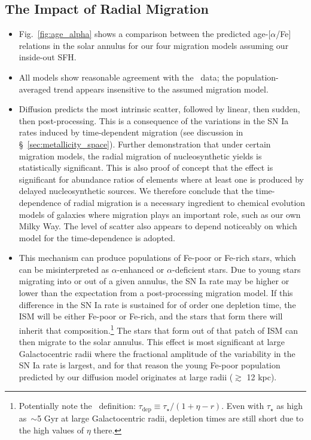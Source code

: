 \documentclass[fleqn, usenatbib]{mnras}
\begin{document}
\subsection{The Impact of Radial Migration} 
\label{sec:age_alpha:migration} 
\begin{itemize} 
	\item Fig.~\ref{fig:age_alpha} shows a comparison 
	between the predicted age-[$\alpha$/Fe] relations in the solar annulus for 
	our four migration models assuming our inside-out SFH. 

	\item All models show reasonable agreement with the~\citet{Feuillet2019} 
	data; the population-averaged trend appears insensitive to the assumed 
	migration model. 

	\item Diffusion predicts the most intrinsic scatter, followed by linear, 
	then sudden, then post-processing. This is a consequence of the variations 
	in the SN Ia rates induced by time-dependent migration (see discussion in 
	\S~\ref{sec:metallicity_space}). Further demonstration that under 
	certain migration models, the radial migration of nucleosynthetic yields 
	is statistically significant. This is also proof of concept that the 
	effect is significant for abundance ratios of elements where at least one 
	is produced by delayed nucleosynthetic sources. We therefore conclude that 
	the time-dependence of radial migration is a necessary ingredient to 
	chemical evolution models of galaxies where migration plays an important 
	role, such as our own Milky Way. The level of scatter also appears to 
	depend noticeably on which model for the time-dependence is adopted. 

	\item This mechanism can produce populations of Fe-poor or Fe-rich stars, 
	which can be misinterpreted as $\alpha$-enhanced or $\alpha$-deficient 
	stars. Due to young stars migrating into or out of a given annulus, the SN 
	Ia rate may be higher or lower than the expectation from a post-processing 
	migration model. If this difference in the SN Ia rate is sustained for of 
	order one depletion time, the ISM will be either Fe-poor or Fe-rich, and 
	the stars that form there will inherit that composition.\footnote{
		{\color{red} Potentially note the~\citet{Weinberg2017} definition: 
		$\tau_\text{dep} \equiv \tau_\star/(1 + \eta - r)$. Even with 
		$\tau_\star$ as high as~$\sim$5 Gyr at large Galactocentric radii, 
		depletion times are still short due to the high values of $\eta$ 
		there.}
	} The stars that form out of that patch of ISM can then migrate to the 
	solar annulus. This effect is most significant at large Galactocentric 
	radii where the fractional amplitude of the variability in the SN Ia rate 
	is largest, and for that reason the young Fe-poor population predicted by 
	our diffusion model originates at large radii ($\gtrsim$ 12 kpc). 


\end{itemize}
\end{document}
